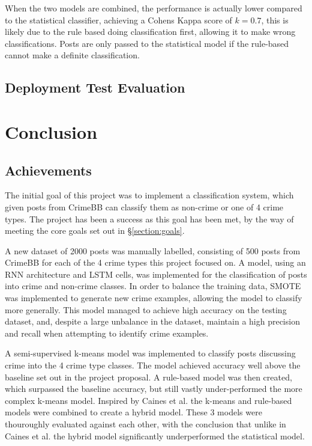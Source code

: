 \documentclass[12pt,a4paper,twoside,openright]{report}
\begin{document}
When the two models are combined, the performance is actually lower compared to the statistical classifier, achieving a Cohens Kappa score of $k=0.7$, this is likely due to the rule based doing classification first, allowing it to make wrong classifications. Posts are only passed to the statistical model if the rule-based cannot make a definite classification. 

\section{Deployment Test Evaluation}
\label{section:deploy}

\chapter{Conclusion}
\section{Achievements}
The initial goal of this project was to implement a classification system, which given posts from CrimeBB can classify them as non-crime or one of 4 crime types. The project has been a success as this goal has been met, by the way of meeting the core goals set out in \S\ref{section:goals}.
\newline

A new dataset of 2000 posts was manually labelled, consisting of 500 posts from CrimeBB for each of the 4 crime types this project focused on. A model, using an RNN architecture and LSTM cells, was implemented for the classification of posts into crime and non-crime classes. In order to balance the training data, SMOTE was implemented to generate new crime examples, allowing the model to classify more generally. This model managed to achieve high accuracy on the testing dataset, and, despite a large unbalance in the dataset, maintain a high precision and recall when attempting to identify crime examples. 
\newline

A semi-supervised k-means model was implemented to classify posts discussing crime into the 4 crime type classes. The model achieved accuracy well above the baseline set out in the project proposal. A rule-based model was then created, which surpassed the baseline accuracy, but still vastly under-performed the more complex k-means model. Inspired by Caines et al. \cite{intent} the k-means and rule-based models were combined to create a hybrid model. These 3 models were thouroughly evaluated against each other, with the conclusion that unlike in Caines et al. the hybrid model significantly underperformed the statistical model.
\newline
\end{document}
